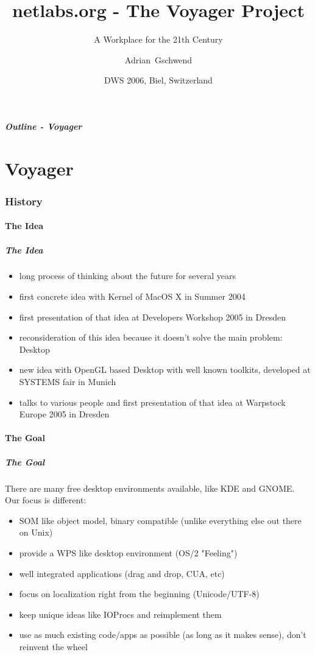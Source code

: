 \documentclass[handout]{beamer}
\title[netlabs.org - The Voyager Project]
{netlabs.org - The Voyager Project}
\subtitle
{A Workplace for the 21th Century}
\author[Adrian Gschwend]
{Adrian~Gschwend}
\institute[netlabs.org]
{
  netlabs.org - Open Source Software for OS/2 and eCS
}
\date[8.4.2006]
{DWS 2006, Biel, Switzerland}
\begin{document}
\begin{frame}
  \titlepage
\end{frame}

\begin{frame}
  \frametitle{Outline - Voyager}
  \tableofcontents[part=1,hideallsubsections]
\end{frame}

\part{Voyager}
\section{History}
\subsection{The Idea}
\begin{frame}
\frametitle{The Idea}
\begin{itemize}
      \item long process of thinking about the future for several years
      \item first concrete idea with Kernel of MacOS X in Summer 2004
      \item first presentation of that idea at Developers Workshop 2005 in Dresden
      \item reconsideration of this idea because it doesn't solve the main problem: Desktop
      \item new idea with OpenGL based Desktop with well known toolkits, developed at SYSTEMS fair in Munich
      \item talks to various people and first presentation of that idea at Warpstock Europe 2005 in Dresden
    \end{itemize}   
\end{frame}

\subsection{The Goal}
\begin{frame}
\frametitle{The Goal}
	There are many free desktop environments available, like KDE and GNOME. Our focus is different:
	\begin{itemize}
		\item SOM like object model, binary compatible (unlike everything else out there on Unix)
		\item provide a WPS like desktop environment (OS/2 "Feeling")
		\item well integrated applications (drag and drop, CUA, etc)
		\item focus on localization right from the beginning (Unicode/UTF-8)
		\item keep unique ideas like IOProcs and reimplement them
		\item use as much existing code/apps as possible (as long as it makes sense), don't reinvent the wheel
	\end{itemize}
\end{frame}
\end{document}
